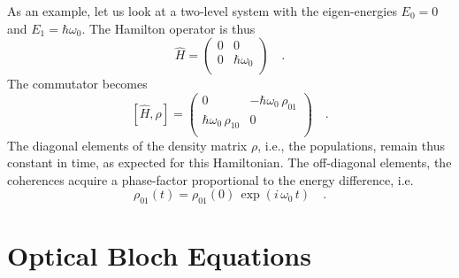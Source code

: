As an example, let us look at a two-level system with the eigen-energies $E_0= 0$ and $E_1 = \hbar \omega_0$. The Hamilton operator is thus
\begin{equation}
 \hat{H } = \begin{pmatrix}
  0 & 0 \\ 0 & \hbar \omega_0 \\
 \end{pmatrix} \quad .
\end{equation}
The commutator becomes
\begin{equation}
 \left[ \hat{H}, \rho \right] = 
 \begin{pmatrix}
 0 & - \hbar \omega_0 \, \rho_{01} \\   \hbar \omega_0 \, \rho_{10} & 0 \\
 \end{pmatrix} \quad .
\end{equation}
The  diagonal elements of the density matrix $\rho$, i.e., the populations, remain thus constant in time, as expected for this Hamiltonian. The off-diagonal elements, the coherences acquire a phase-factor proportional to the energy difference, i.e.
\begin{equation}
 \rho_{01}(t) =  \rho_{01}(0) \, \exp \left(i \, \omega_0 \, t \right)  \quad .
\end{equation}

\section{Optical Bloch Equations}

